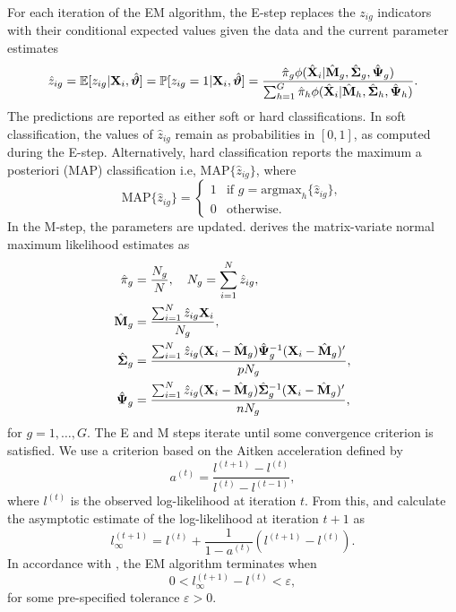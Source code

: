 \documentclass[12pt, centerh1]{article}
\begin{document}
For each iteration of the EM algorithm, the E-step replaces the $z_{ig}$ indicators with their conditional expected values given the data and the current parameter estimates
\begin{equation*}
\hat{z}_{ig} = \mathbb{E}[z_{ig} | {\bf X}_i, \hat{\bm{\vartheta}}] = \mathbb{P}[z_{ig} = 1 | {\bf X}_i, \hat{\bm{\vartheta}}] = \frac{\hat{\pi}_g \phi(\hat{\bf {X}}_i |\hat{\bf {M}}_g, \hat{\bf {\Sigma}}_g, \hat{\bf{\Psi}}_g)}{\sum_{h=1}^G \hat{\pi}_h \phi(\hat{\bf {X}}_i |\hat{\bf {M}}_h, \hat{\bf {\Sigma}}_h, \hat{\bf{\Psi}}_h)}.
\end{equation*}
The predictions are reported as either soft or hard classifications. In soft classification, the values of $\hat{z}_{ig}$ remain as probabilities in $[0, 1]$, as computed during the E-step. Alternatively, hard classification reports the maximum a posteriori (MAP) classification i.e, $\text{MAP}\{ \hat{z}_{ig}\}$, where 
\begin{equation*}
\text{MAP}\{ \hat{z}_{ig}\} = 
\begin{cases}
    1 & \text{if $g = \text{argmax}_h \{ \hat{z}_{ig}\}$}, \\
    0 & \text{otherwise}.
\end{cases}
\end{equation*}
In the M-step, the parameters are updated. \citet{viroli2011} derives the matrix-variate normal maximum likelihood estimates as
\[
\begin{aligned}
\hat{\pi}_g & = \frac{N_g}{N}, \quad N_g = \sum_{i=1}^N \hat{z}_{ig}, \\
\hat{{\bf M}}_g & = \frac{\sum_{i=1}^N \hat{z}_{ig}{\bf X}_i}{N_g}, \\
\hat{{\bf \Sigma}}_g & = \frac{\sum_{i=1}^N \hat{z}_{ig}({\bf X}_i - \hat{\bf M}_g) \hat{\bf \Psi}_g^{-1}({\bf X}_i - \hat{\bf M}_g)'}{pN_g}, \\
\hat{{\bf \Psi}}_g & = \frac{\sum_{i=1}^N \hat{z}_{ig}({\bf X}_i - \hat{\bf M}_g) \hat{\bf \Sigma}_g^{-1}({\bf X}_i - \hat{\bf M}_g)'}{nN_g},
\end{aligned}
\]
for $g = 1, \dots, G$. The E and M steps iterate until some convergence criterion is satisfied. We use a criterion based on the Aitken acceleration \citep{aitken1926} defined by 
\begin{equation*}
a^{(t)} = \frac{l^{(t+1)} - l^{(t)} }{l^{(t)} - l^{(t-1)}},
\end{equation*}
where $l^{(t)}$ is the observed log-likelihood at iteration $t$. From this, \citet{lindsay1995} and \citet{bohning1994} calculate the asymptotic estimate of the log-likelihood at iteration $t+1$ as
\begin{equation*}
l_{\infty}^{(t+1)} = l^{(t)} + \frac{1}{1- a^{(t)}} (l^{(t+1)} - l^{(t)}).
\end{equation*}
In accordance with \citet{mcnicholas2010}, the EM algorithm terminates when 
\begin{equation*}
0< l_{\infty}^{(t+1)} - l^{(t)} < \varepsilon,
\end{equation*}
for some pre-specified tolerance $\varepsilon > 0$.
\end{document}
